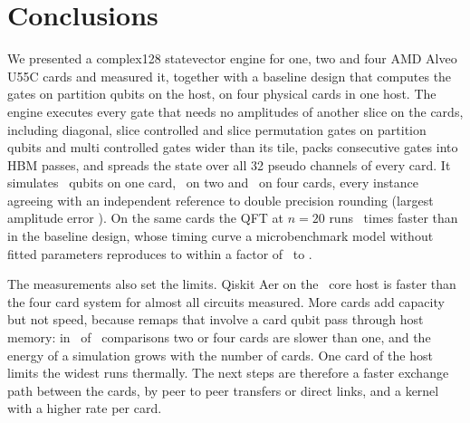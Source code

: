\section{Conclusions}\label{sec:conclusions}

We presented a complex128 statevector engine for one, two and four AMD Alveo U55C cards and measured it, together with
a baseline design that computes the gates on partition qubits on the host, on four physical cards in one host. The engine executes every gate that needs no
amplitudes of another slice on the cards, including diagonal, slice controlled and slice permutation gates on partition
qubits and multi controlled gates wider than its tile, packs consecutive gates into HBM passes, and spreads the
state over all 32 pseudo channels of every card. It simulates \NumMaxWidthOneCard~qubits on one card, \NumMaxWidthTwoCards~on two and \NumMaxWidthFourCards~on four cards,
every instance agreeing with an independent reference to double precision rounding (largest amplitude error
\NumWorstMaxAbsErr). On the same cards the QFT at $n=20$ runs \NumSubmittedOverRevisedQftTwenty~times faster than in the
baseline design, whose timing curve a microbenchmark model without fitted parameters reproduces to within a factor
of \NumModelRatioMin~to \NumModelRatioMax.

The measurements also set the limits. Qiskit Aer on the \NumHostCores~core host is faster than the four card system for
almost all circuits measured. More cards add capacity but not speed, because remaps that involve a card qubit pass
through host memory: in \NumScaleBelowOne~of \NumScaleCases~comparisons two or four cards are slower than one, and the
energy of a simulation grows with the number of cards. One card of the host limits the widest runs thermally. The next
steps are therefore a faster exchange path between the cards, by peer to peer transfers or direct links, and a kernel
with a higher rate per card.
